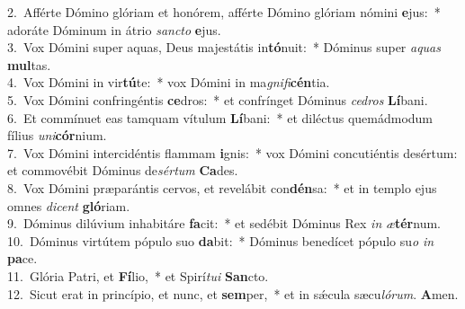 {2.~}Afférte Dómino glóriam et honórem, afférte Dómino glóriam nómini \textbf{e}jus:~* adoráte Dóminum in átrio \textit{san}\textit{cto} \textbf{e}jus.\\
{3.~}Vox Dómini super aquas, Deus majestátis in\textbf{tó}nuit:~* Dóminus super \textit{a}\textit{quas} \textbf{mul}tas.\\
{4.~}Vox Dómini in vir\textbf{tú}te:~* vox Dómini in ma\textit{gni}\textit{fi}\textbf{cén}tia.\\
{5.~}Vox Dómini confringéntis \textbf{ce}dros:~* et confrínget Dóminus \textit{ce}\textit{dros} \textbf{Lí}bani.\\
{6.~}Et commínuet eas tamquam vítulum \textbf{Lí}bani:~* et diléctus quemádmodum fílius \textit{u}\textit{ni}\textbf{cór}nium.\\
{7.~}Vox Dómini intercidéntis flammam \textbf{i}gnis:~* vox Dómini concutiéntis desértum: et commovébit Dóminus de\textit{sér}\textit{tum} \textbf{Ca}des.\\
{8.~}Vox Dómini præparántis cervos, et revelábit con\textbf{dén}sa:~* et in templo ejus omnes \textit{di}\textit{cent} \textbf{gló}riam.\\
{9.~}Dóminus dilúvium inhabitáre \textbf{fa}cit:~* et sedébit Dóminus Rex \textit{in} \textit{æ}\textbf{tér}num.\\
{10.~}Dóminus virtútem pópulo suo \textbf{da}bit:~* Dóminus benedícet pópulo su\textit{o} \textit{in} \textbf{pa}ce.\\
{11.~}Glória Patri, et \textbf{Fí}lio,~* et Spirí\textit{tu}\textit{i} \textbf{San}cto.\\
{12.~}Sicut erat in princípio, et nunc, et \textbf{sem}per,~* et in sǽcula sæcu\textit{ló}\textit{rum}. \textbf{A}men.\\
